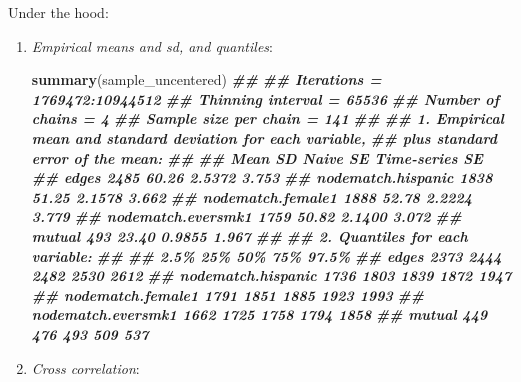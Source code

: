 \documentclass[
]{book}
\newenvironment{Shaded}{\begin{snugshade}}{\end{snugshade}}
\newcommand{\DocumentationTok}[1]{\textcolor[rgb]{0.56,0.35,0.01}{\textbf{\textit{#1}}}}
\newcommand{\FunctionTok}[1]{\textcolor[rgb]{0.13,0.29,0.53}{\textbf{#1}}}
\newcommand{\NormalTok}[1]{#1}
\begin{document}
Under the hood:

\begin{enumerate}
\def\labelenumi{\arabic{enumi}.}
\item
  \emph{Empirical means and sd, and quantiles}:

\begin{Shaded}
\begin{Highlighting}[]
\FunctionTok{summary}\NormalTok{(sample\_uncentered)}
\DocumentationTok{\#\# }
\DocumentationTok{\#\# Iterations = 1769472:10944512}
\DocumentationTok{\#\# Thinning interval = 65536 }
\DocumentationTok{\#\# Number of chains = 4 }
\DocumentationTok{\#\# Sample size per chain = 141 }
\DocumentationTok{\#\# }
\DocumentationTok{\#\# 1. Empirical mean and standard deviation for each variable,}
\DocumentationTok{\#\#    plus standard error of the mean:}
\DocumentationTok{\#\# }
\DocumentationTok{\#\#                    Mean    SD Naive SE Time{-}series SE}
\DocumentationTok{\#\# edges              2485 60.26   2.5372          3.753}
\DocumentationTok{\#\# nodematch.hispanic 1838 51.25   2.1578          3.662}
\DocumentationTok{\#\# nodematch.female1  1888 52.78   2.2224          3.779}
\DocumentationTok{\#\# nodematch.eversmk1 1759 50.82   2.1400          3.072}
\DocumentationTok{\#\# mutual              493 23.40   0.9855          1.967}
\DocumentationTok{\#\# }
\DocumentationTok{\#\# 2. Quantiles for each variable:}
\DocumentationTok{\#\# }
\DocumentationTok{\#\#                    2.5\%  25\%  50\%  75\% 97.5\%}
\DocumentationTok{\#\# edges              2373 2444 2482 2530  2612}
\DocumentationTok{\#\# nodematch.hispanic 1736 1803 1839 1872  1947}
\DocumentationTok{\#\# nodematch.female1  1791 1851 1885 1923  1993}
\DocumentationTok{\#\# nodematch.eversmk1 1662 1725 1758 1794  1858}
\DocumentationTok{\#\# mutual              449  476  493  509   537}
\end{Highlighting}
\end{Shaded}
\item
  \emph{Cross correlation}:


\end{enumerate}
\end{document}
